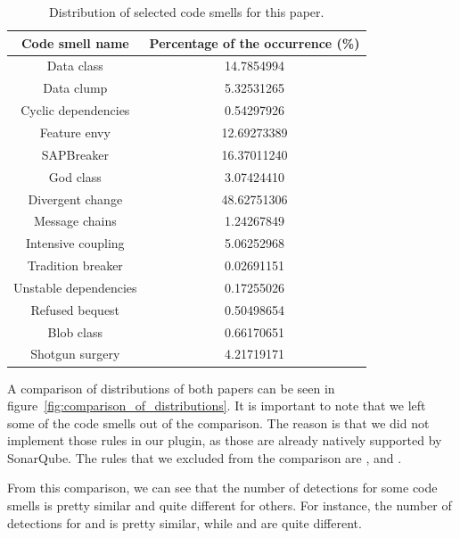 \begin{table}
    \begin{center}
        \begin{tabular} {| c | c |}
            \hline
            \textbf{Code smell name} & \textbf{Percentage of the occurrence (\%)} \\ \hline
            Data class & 14.7854994 \\ \hline
            Data clump & 5.32531265 \\ \hline
            Cyclic dependencies & 0.54297926 \\ \hline
            Feature envy & 12.69273389 \\ \hline
            SAPBreaker & 16.37011240 \\ \hline
            God class & 3.07424410 \\ \hline
            Divergent change & 48.62751306 \\ \hline
            Message chains & 1.24267849 \\ \hline
            Intensive coupling & 5.06252968 \\ \hline
            Tradition breaker & 0.02691151 \\ \hline
            Unstable dependencies & 0.17255026 \\ \hline
            Refused bequest & 0.50498654 \\ \hline
            Blob class & 0.66170651 \\ \hline
            Shotgun surgery & 4.21719171 \\ \hline
        \end{tabular}
        \caption{Distribution of selected code smells for this paper.}
        \label{tab:sonar_academic_plugin_values}
    \end{center}
\end{table}

A comparison of distributions of both papers can be seen in figure~\ref{fig:comparison_of_distributions}.
It is important to note that we left some of the code smells out of the comparison.
The reason is that we did not implement those rules in our plugin, as those are already natively
supported by SonarQube.
The rules that we excluded from the comparison are ,  and
.


From this comparison, we can see that the number of detections for some code smells is pretty similar and quite different for others.
For instance, the number of detections for  and  is pretty similar, while
 and  are quite different.

